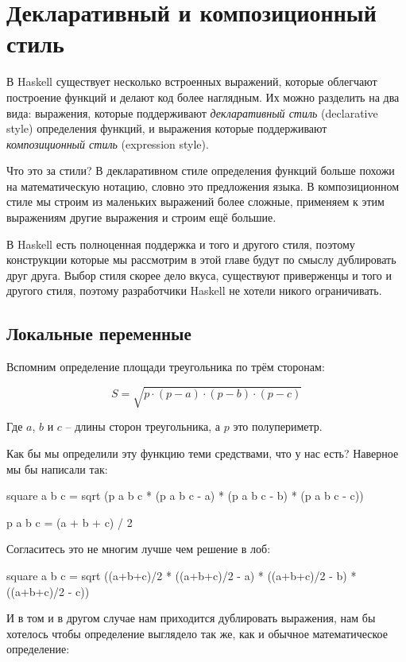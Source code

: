\setcounter{chapter}{3}
\chapter{Декларативный и композиционный стиль}

В Haskell существует несколько встроенных выражений,
которые облегчают построение функций и делают код более
наглядным. Их можно разделить на два вида: выражения,
которые поддерживают \emph{декларативный стиль} 
(declarative style) определения функций,
и выражения которые поддерживают 
\emph{композиционный стиль} (expression style).

Что это за стили? В декларативном стиле определения функций
больше похожи на математическую нотацию, словно это
предложения языка. В композиционном стиле мы строим 
из маленьких выражений более сложные, применяем к этим
выражениям другие выражения и строим ещё большие. 

В Haskell есть полноценная поддержка и того и другого стиля, поэтому
конструкции которые мы рассмотрим в этой главе будут по смыслу
дублировать друг друга. Выбор стиля скорее дело вкуса, существуют
приверженцы и того и другого стиля, поэтому разработчики Haskell
не хотели никого ограничивать. 

\section{Локальные переменные}

Вспомним определение площади треугольника по трём сторонам:

\[  S = \sqrt{p \cdot (p - a) \cdot (p - b) \cdot (p - c)} \]

Где $a$, $b$ и $c$ -- длины сторон треугольника, а $p$ это
полупериметр. 

Как бы мы определили эту функцию теми средствами, что у нас
есть? Наверное мы бы написали так:

\begin{code}
square a b c = sqrt (p a b c * (p a b c - a) * (p a b c - b) * (p a b c - c))

p a b c = (a + b + c) / 2
\end{code}

Согласитесь это не многим лучше чем решение в лоб:

\begin{code}
square a b c = sqrt ((a+b+c)/2 * ((a+b+c)/2 - a) * ((a+b+c)/2 - b) * ((a+b+c)/2 - c))
\end{code}

И в том и в другом случае нам приходится дублировать выражения, нам бы
хотелось чтобы определение выглядело так же, как и обычное математическое
определение:

